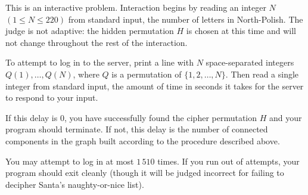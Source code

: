 
This is an interactive problem. Interaction begins by reading an integer $N$ $(1 \leq N \leq 220)$ from standard input, the number of letters in North-Polish. The judge is not adaptive: the hidden permutation $H$ is chosen at this time and will not change throughout the rest of the interaction.

To attempt to log in to the server, print a line with $N$ space-separated integers $Q(1), \ldots, Q(N)$, where $Q$ is a permutation of $\{1, 2, \ldots, N\}$. Then read a single integer from standard input, the amount of time in seconds it takes for the server to respond to your input.

If this delay is $0$, you have successfully found the cipher permutation $H$ and your program should terminate. If not, this delay is the number of connected components in the graph built according to the procedure described above.

You may attempt to log in at most $1\,510$ times. If you run out of attempts, your program should exit cleanly (though it will be judged incorrect for failing to decipher Santa's naughty-or-nice list).

